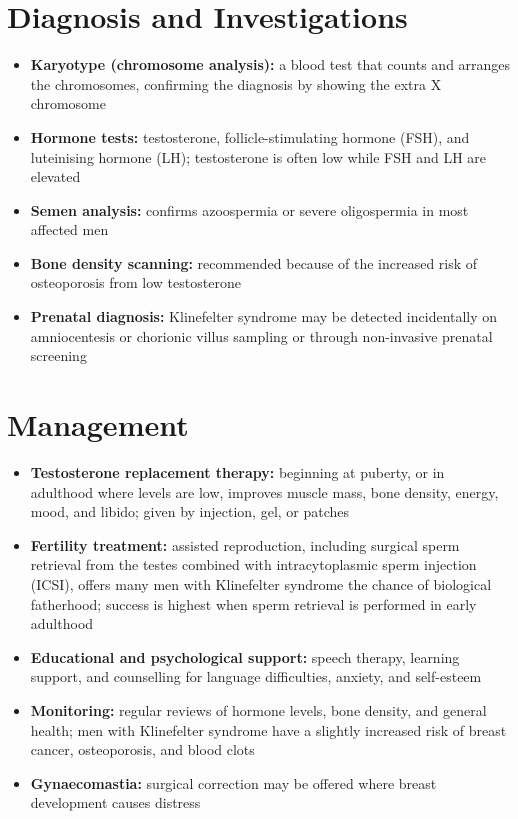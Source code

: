 \section*{Diagnosis and Investigations}
\begin{itemize}
    \item \textbf{Karyotype (chromosome analysis):} a blood test that counts and arranges the chromosomes, confirming the diagnosis by showing the extra X chromosome
    \item \textbf{Hormone tests:} testosterone, follicle-stimulating hormone (FSH), and luteinising hormone (LH); testosterone is often low while FSH and LH are elevated
    \item \textbf{Semen analysis:} confirms azoospermia or severe oligospermia in most affected men
    \item \textbf{Bone density scanning:} recommended because of the increased risk of osteoporosis from low testosterone
    \item \textbf{Prenatal diagnosis:} Klinefelter syndrome may be detected incidentally on amniocentesis or chorionic villus sampling or through non-invasive prenatal screening
\end{itemize}

\section*{Management}
\begin{itemize}
    \item \textbf{Testosterone replacement therapy:} beginning at puberty, or in adulthood where levels are low, improves muscle mass, bone density, energy, mood, and libido; given by injection, gel, or patches
    \item \textbf{Fertility treatment:} assisted reproduction, including surgical sperm retrieval from the testes combined with intracytoplasmic sperm injection (ICSI), offers many men with Klinefelter syndrome the chance of biological fatherhood; success is highest when sperm retrieval is performed in early adulthood
    \item \textbf{Educational and psychological support:} speech therapy, learning support, and counselling for language difficulties, anxiety, and self-esteem
    \item \textbf{Monitoring:} regular reviews of hormone levels, bone density, and general health; men with Klinefelter syndrome have a slightly increased risk of breast cancer, osteoporosis, and blood clots
    \item \textbf{Gynaecomastia:} surgical correction may be offered where breast development causes distress
\end{itemize}

